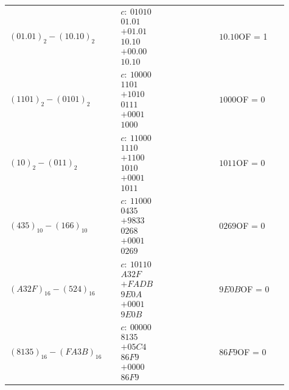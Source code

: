 \documentclass[a4paper,11pt]{article}
\numberwithin{equation}{section}
\newcommand{\redlinija}{\arrayrulecolor{black!28}\specialrule{0.3pt}{2pt}{2pt}\arrayrulecolor{black}}
\begin{document}
\begin{longtable}{p{0.34\linewidth} p{0.34\linewidth} p{0.23\linewidth}}
\redlinija
$(01.01)_{2}-(10.10)_{2}$ & $\begin{array}{r}c:\ 01010\\01.01\\+01.01\\\hline 10.10\\+00.00\\\hline 10.10\end{array}$ & $10.10$\newline OF = 1\\[5pt]
\redlinija
$(1101)_{2}-(0101)_{2}$ & $\begin{array}{r}c:\ 10000\\1101\\+1010\\\hline 0111\\+0001\\\hline 1000\end{array}$ & $1000$\newline OF = 0\\[5pt]
\redlinija
$(10)_{2}-(011)_{2}$ & $\begin{array}{r}c:\ 11000\\1110\\+1100\\\hline 1010\\+0001\\\hline 1011\end{array}$ & $1011$\newline OF = 0\\[5pt]
\redlinija
$(435)_{10}-(166)_{10}$ & $\begin{array}{r}c:\ 11000\\0435\\+9833\\\hline 0268\\+0001\\\hline 0269\end{array}$ & $0269$\newline OF = 0\\[5pt]
\redlinija
$(A32F)_{16}-(524)_{16}$ & $\begin{array}{r}c:\ 10110\\A32F\\+FADB\\\hline 9E0A\\+0001\\\hline 9E0B\end{array}$ & $9E0B$\newline OF = 0\\[5pt]
\redlinija
$(8135)_{16}-(FA3B)_{16}$ & $\begin{array}{r}c:\ 00000\\8135\\+05C4\\\hline 86F9\\+0000\\\hline 86F9\end{array}$ & $86F9$\newline OF = 0\\[5pt]

\end{longtable}
\end{document}
